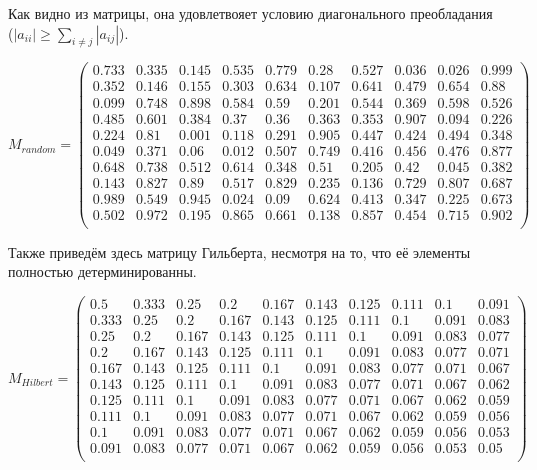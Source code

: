 \documentclass[../../report.tex]{subfiles}
\begin{document}
Как видно из матрицы, она удовлетвояет условию диагонального преобладания \\
($|a_{ii}| \geq \sum_{i \neq j} |a_{ij}| $).

\[
    M_{random} = 
    \begin{pmatrix}
        0.733 & 0.335 & 0.145 & 0.535 & 0.779 & 0.28  & 0.527 & 0.036 & 0.026 & 0.999 \\
        0.352 & 0.146 & 0.155 & 0.303 & 0.634 & 0.107 & 0.641 & 0.479 & 0.654 & 0.88  \\
        0.099 & 0.748 & 0.898 & 0.584 & 0.59  & 0.201 & 0.544 & 0.369 & 0.598 & 0.526 \\
        0.485 & 0.601 & 0.384 & 0.37  & 0.36  & 0.363 & 0.353 & 0.907 & 0.094 & 0.226 \\
        0.224 & 0.81  & 0.001 & 0.118 & 0.291 & 0.905 & 0.447 & 0.424 & 0.494 & 0.348 \\
        0.049 & 0.371 & 0.06  & 0.012 & 0.507 & 0.749 & 0.416 & 0.456 & 0.476 & 0.877 \\
        0.648 & 0.738 & 0.512 & 0.614 & 0.348 & 0.51  & 0.205 & 0.42  & 0.045 & 0.382 \\
        0.143 & 0.827 & 0.89  & 0.517 & 0.829 & 0.235 & 0.136 & 0.729 & 0.807 & 0.687 \\
        0.989 & 0.549 & 0.945 & 0.024 & 0.09  & 0.624 & 0.413 & 0.347 & 0.225 & 0.673 \\
        0.502 & 0.972 & 0.195 & 0.865 & 0.661 & 0.138 & 0.857 & 0.454 & 0.715 & 0.902 \\

    \end{pmatrix}
\]

Также приведём здесь матрицу Гильберта, несмотря на то, что её элементы полностью детерминированны.

\[
    M_{Hilbert} =
    \begin{pmatrix}
        0.5   & 0.333 & 0.25  & 0.2   & 0.167 & 0.143 & 0.125 & 0.111 & 0.1   & 0.091 \\
        0.333 & 0.25  & 0.2   & 0.167 & 0.143 & 0.125 & 0.111 & 0.1   & 0.091 & 0.083 \\
        0.25  & 0.2   & 0.167 & 0.143 & 0.125 & 0.111 & 0.1   & 0.091 & 0.083 & 0.077 \\
        0.2   & 0.167 & 0.143 & 0.125 & 0.111 & 0.1   & 0.091 & 0.083 & 0.077 & 0.071 \\
        0.167 & 0.143 & 0.125 & 0.111 & 0.1   & 0.091 & 0.083 & 0.077 & 0.071 & 0.067 \\
        0.143 & 0.125 & 0.111 & 0.1   & 0.091 & 0.083 & 0.077 & 0.071 & 0.067 & 0.062 \\
        0.125 & 0.111 & 0.1   & 0.091 & 0.083 & 0.077 & 0.071 & 0.067 & 0.062 & 0.059 \\
        0.111 & 0.1   & 0.091 & 0.083 & 0.077 & 0.071 & 0.067 & 0.062 & 0.059 & 0.056 \\
        0.1   & 0.091 & 0.083 & 0.077 & 0.071 & 0.067 & 0.062 & 0.059 & 0.056 & 0.053 \\
        0.091 & 0.083 & 0.077 & 0.071 & 0.067 & 0.062 & 0.059 & 0.056 & 0.053 & 0.05  \\
    \end{pmatrix}
\]
\end{document}
